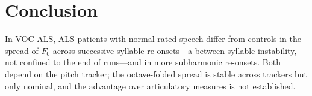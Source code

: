 \documentclass{article}
\begin{document}
\section{Conclusion}
\label{sec:conclusion}
In VOC-ALS, ALS patients with normal-rated speech differ from controls in the spread of $F_0$ across successive syllable re-onsets---a between-syllable instability, not confined to the end of runs---and in more subharmonic re-onsets. Both depend on the pitch tracker; the octave-folded spread is stable across trackers but only nominal, and the advantage over articulatory measures is not established.



\end{document}
